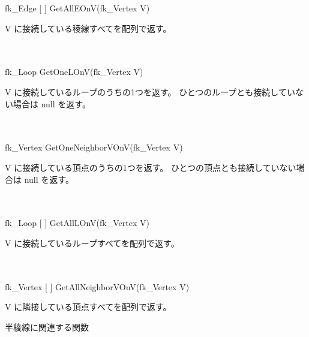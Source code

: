 \begin{tabbing}
\> fk\_Edge [ ] GetAllEOnV(fk\_Vertex V) \\
	\> \> \begin{minipage}[]{15cm}
		V に接続している稜線すべてを配列で返す。
	\end{minipage} \\ \\

\> fk\_Loop GetOneLOnV(fk\_Vertex V) \\
	\> \> \begin{minipage}[]{15cm}
		V に接続しているループのうちの1つを返す。
		ひとつのループとも接続していない場合は null を返す。
	\end{minipage} \\ \\

\> fk\_Vertex GetOneNeighborVOnV(fk\_Vertex V) \\
	\> \> \begin{minipage}[]{15cm}
		V に接続している頂点のうちの1つを返す。
		ひとつの頂点とも接続していない場合は null を返す。
	\end{minipage} \\ \\

\> fk\_Loop [ ] GetAllLOnV(fk\_Vertex V) \\
	\> \> \begin{minipage}[]{15cm}
		V に接続しているループすべてを配列で返す。
	\end{minipage} \\ \\

\> fk\_Vertex [ ] GetAllNeighborVOnV(fk\_Vertex V) \\
	\> \> \begin{minipage}[]{15cm}
		V に隣接している頂点すべてを配列で返す。
	\end{minipage}
\end{tabbing}
\begin{center}
{\large 半稜線に関連する関数}
\end{center}
